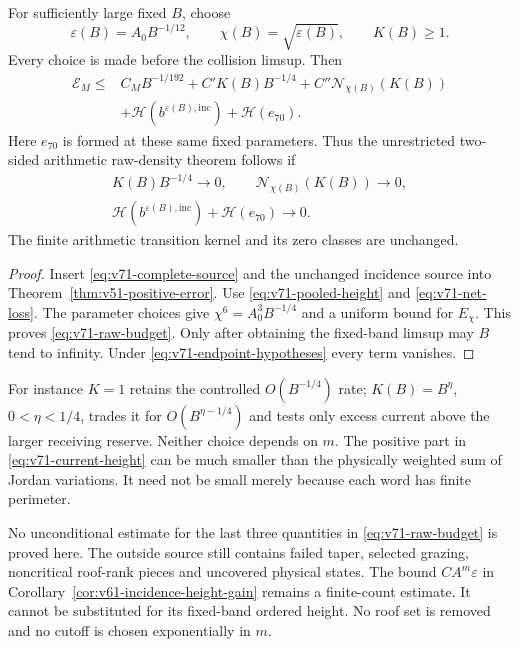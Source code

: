 \begin{corollary}
\label{cor:v71-raw-budget}
For sufficiently large fixed $B$, choose
\[
 \varepsilon(B)=A_0B^{-1/12},\qquad
 \chi(B)=\sqrt{\varepsilon(B)},\qquad K(B)\ge1.
\]
Every choice is made before the collision limsup. Then
\begin{equation}\label{eq:v71-raw-budget}
 \begin{split}
 \mathcal E_M\le{}&C_MB^{-1/192}+C'K(B)B^{-1/4}
                    +C''\mathcal N_{\chi(B)}(K(B))\\
                 &+\mathcal H(b^{\varepsilon(B),\mathrm{inc}})
                    +\mathcal H(e_{70}).
 \end{split}
\end{equation}
Here $e_{70}$ is formed at these same fixed parameters. Thus the
unrestricted two-sided arithmetic raw-density theorem follows if
\begin{equation}\label{eq:v71-endpoint-hypotheses}
 \begin{gathered}
 K(B)B^{-1/4}\longrightarrow0,\qquad
 \mathcal N_{\chi(B)}(K(B))\longrightarrow0,\\
 \mathcal H(b^{\varepsilon(B),\mathrm{inc}})
                    +\mathcal H(e_{70})\longrightarrow0.
 \end{gathered}
\end{equation}
The finite arithmetic transition kernel and its zero classes are
unchanged.
\end{corollary}
\begin{proof}
Insert \eqref{eq:v71-complete-source} and the unchanged incidence
source into Theorem~\ref{thm:v51-positive-error}. Use
\eqref{eq:v71-pooled-height} and \eqref{eq:v71-net-loss}.
The parameter choices give $\chi^6=A_0^3B^{-1/4}$ and a
uniform bound for $E_\chi$. This proves \eqref{eq:v71-raw-budget}.
Only after obtaining the fixed-band limsup may $B$ tend to infinity.
Under \eqref{eq:v71-endpoint-hypotheses} every term vanishes.
\end{proof}

For instance $K=1$ retains the controlled $O(B^{-1/4})$ rate;
$K(B)=B^\eta$, $0<\eta<1/4$, trades it for
$O(B^{\eta-1/4})$ and tests only excess current above the larger
receiving reserve. Neither choice depends on $m$. The positive part
in \eqref{eq:v71-current-height} can be much smaller than the
physically weighted sum of Jordan variations. It need not be small
merely because each word has finite perimeter.

No unconditional estimate for the last three quantities in
\eqref{eq:v71-raw-budget} is proved here. The outside source still
contains failed taper, selected grazing, noncritical roof-rank pieces
and uncovered physical states. The bound $CA^m\varepsilon$ in
Corollary~\ref{cor:v61-incidence-height-gain} remains a finite-count
estimate. It cannot be substituted for its fixed-band ordered height.
No roof set is removed and no cutoff is chosen exponentially in $m$.

